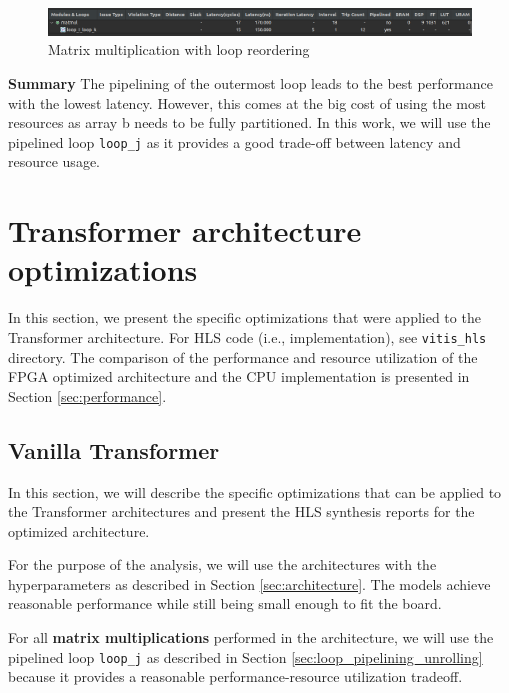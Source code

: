 \documentclass[a4paper, twoside]{report}
\theoremstyle{definition}
\numberwithin{equation}{section}
\begin{document}
\begin{figure}[h!]
    \centering
    \includegraphics[width=\textwidth]{matmul_loop_reordering.png}
    \caption{Matrix multiplication with loop reordering}
    \label{fig:matmul_loop_reordering}
\end{figure}

\textbf{Summary}
The pipelining of the outermost loop leads to the best performance with the lowest latency.
However, this comes at the big cost of using the most resources as array b
needs to be fully partitioned.
In this work, we will use the pipelined loop \texttt{loop\_j}
as it provides a good trade-off between latency and resource usage.

\section{Transformer architecture optimizations} \label{sec:transformer_optimizations}

In this section, we present the specific optimizations that were applied to the Transformer architecture.
For HLS code (i.e., implementation), see \texttt{vitis\_hls} directory.
The comparison of the performance and resource utilization of the FPGA optimized architecture
and the CPU implementation is presented in Section \ref{sec:performance}.

\subsection{Vanilla Transformer} \label{sec:fpga_vanilla_transformer}

In this section, we will describe the specific optimizations that can be applied to the Transformer architectures
and present the HLS synthesis reports for the optimized architecture.

For the purpose of the analysis, we will use the architectures with the
hyperparameters as described in Section \ref{sec:architecture}.
The models achieve reasonable performance while still being small enough
to fit the board.

For all \textbf{matrix multiplications} performed in the architecture, we will use the pipelined loop \texttt{loop\_j}
as described in Section \ref{sec:loop_pipelining_unrolling} because
it provides a reasonable performance-resource utilization tradeoff.
\end{document}
